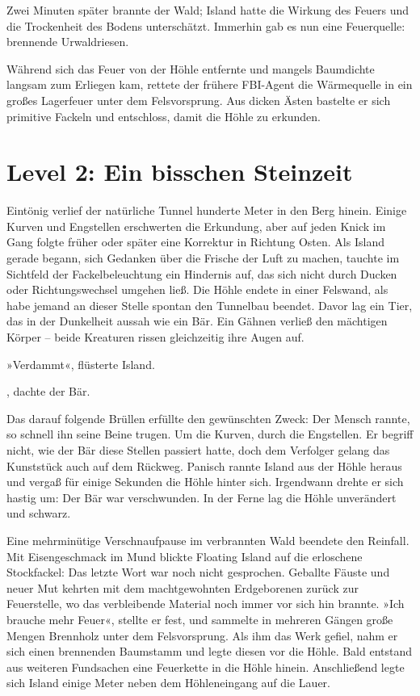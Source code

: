 Zwei Minuten später brannte der Wald; Island hatte die Wirkung des Feuers und die Trockenheit des Bodens unterschätzt. Immerhin gab es nun eine Feuerquelle: brennende Urwaldriesen.

Während sich das Feuer von der Höhle entfernte und mangels Baumdichte langsam zum Erliegen kam, rettete der frühere FBI-Agent die Wärmequelle in ein großes Lagerfeuer unter dem Felsvorsprung. Aus dicken Ästen bastelte er sich primitive Fackeln und entschloss, damit die Höhle zu erkunden.

\section{Level 2: Ein bisschen Steinzeit}

Eintönig verlief der natürliche Tunnel hunderte Meter in den Berg hinein. Einige Kurven und Engstellen erschwerten die Erkundung, aber auf jeden Knick im Gang folgte früher oder später eine Korrektur in Richtung Osten. Als Island gerade begann, sich Gedanken über die Frische der Luft zu machen, tauchte im Sichtfeld der Fackelbeleuchtung ein Hindernis auf, das sich nicht durch Ducken oder Richtungswechsel umgehen ließ. Die Höhle endete in einer Felswand, als habe jemand an dieser Stelle spontan den Tunnelbau beendet. Davor lag ein Tier, das in der Dunkelheit aussah wie ein Bär. Ein Gähnen verließ den mächtigen Körper – beide Kreaturen rissen gleichzeitig ihre Augen auf.

»Verdammt«, flüsterte Island.

, dachte der Bär. 

Das darauf folgende Brüllen erfüllte den gewünschten Zweck: Der Mensch rannte, so schnell ihn seine Beine trugen. Um die Kurven, durch die Engstellen. Er begriff nicht, wie der Bär diese Stellen passiert hatte, doch dem Verfolger gelang das Kunststück auch auf dem Rückweg. Panisch rannte Island aus der Höhle heraus und vergaß für einige Sekunden die Höhle hinter sich. Irgendwann drehte er sich hastig um: Der Bär war verschwunden. In der Ferne lag die Höhle unverändert und schwarz.

Eine mehrminütige Verschnaufpause im verbrannten Wald beendete den Reinfall. Mit Eisengeschmack im Mund blickte Floating Island auf die erloschene Stockfackel: Das letzte Wort war noch nicht gesprochen. Geballte Fäuste und neuer Mut kehrten mit dem machtgewohnten Erdgeborenen zurück zur Feuerstelle, wo das verbleibende Material noch immer vor sich hin brannte. »Ich brauche mehr Feuer«, stellte er fest, und sammelte in mehreren Gängen große Mengen Brennholz unter dem Felsvorsprung. Als ihm das Werk gefiel, nahm er sich einen brennenden Baumstamm und legte diesen vor die Höhle. Bald entstand aus weiteren Fundsachen eine Feuerkette in die Höhle hinein. Anschließend legte sich Island einige Meter neben dem Höhleneingang auf die Lauer.

